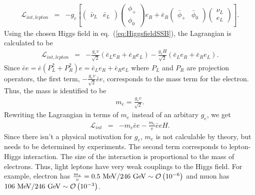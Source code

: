 \begin{eqnarray} 
\mathcal{L}_{int, lepton} 
&=& 
-g_e \left[ 
\left(  \begin{array}{cc} \bar{\nu}_L & \bar{e}_L \end{array} \right)
\left(  \begin{array}{c} \phi_+  \\ \phi_0 \end{array} \right) e_R
+ 
\bar{e}_R
\left(  \begin{array}{cc} \bar{\phi}_+  & \bar{\phi}_0 \end{array} \right) 
\left(  \begin{array}{c} \nu_L \\ e_L \end{array} \right)
\right].
\end{eqnarray} 
Using the chosen Higgs field in eq.~(\ref{eq:HiggsfieldSSB}), 
the Lagrangian is calculated to be 
\begin{eqnarray} 
\mathcal{L}_{int, lepton} 
&=& 
-\frac{g_e v}{\sqrt{2}}\left( \bar{e}_L e_R + \bar{e}_R e_L \right)  
-\frac{g_e H}{\sqrt{2}}\left( \bar{e}_L e_R + \bar{e}_R e_L \right). 
\end{eqnarray}
Since $\bar{e}e = \bar{e}(P_L^2+P_R^2)e = \bar{e}_L e_R + \bar{e}_R e_L$ where
$P_L$ and $P_R$ are projection operators, the first term, 
$\displaystyle -\frac{g_e v}{\sqrt{2}} \bar{e}e$, corresponds to the mass term for the electron. 
Thus, the mass is identified to be 
\begin{eqnarray} 
m_e = \frac{g_e v}{\sqrt{2}}.
\end{eqnarray} 
Rewriting the Lagrangian in terms of $m_e$ instead of an arbitary $g_e$, we get 
\begin{eqnarray} 
\mathcal{L}_{int} 
&=& 
- m_e \bar{e}e  -\frac{m_e}{v} \bar{e}e H. 
\end{eqnarray} 
Since there isn't a physical motivation for $g_e$, $m_e$ is not calculable 
by theory, but needs to be determined by experiments. The second term 
corresponds to lepton-Higgs interaction. The size of the interaction 
is proportional to the mass of electrons. Thus, light leptons have very 
weak couplings to the Higgs field. For example, electron has 
$\frac{m_e}{v} = 0.5~\mathrm{Me\kern -0.1em V}/246~\mathrm{Ge\kern -0.1em V} \sim \mathcal{O}\left(10^{-6}\right)$
and muon has $106~\mathrm{Me\kern -0.1em V}/246~\mathrm{Ge\kern -0.1em V} \sim \mathcal{O}\left(10^{-3}\right)$.

